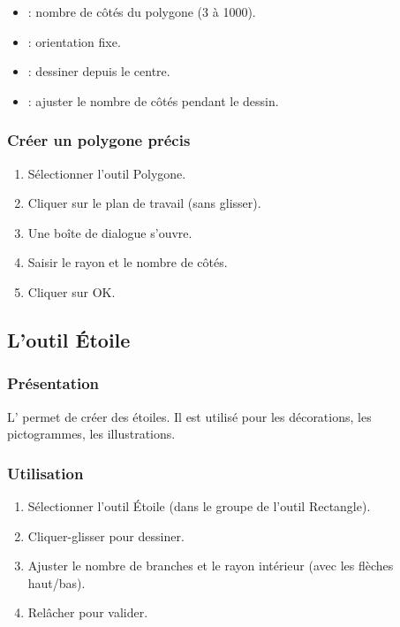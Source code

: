 \begin{itemize}
    \item {} : nombre de côtés du polygone (3 à 1000).
    \item {} : orientation fixe.
    \item {} : dessiner depuis le centre.
    \item {} : ajuster le nombre de côtés pendant le dessin.
\end{itemize}

\subsubsection{Créer un polygone précis}

\begin{enumerate}
    \item Sélectionner l'outil Polygone.
    \item Cliquer sur le plan de travail (sans glisser).
    \item Une boîte de dialogue s'ouvre.
    \item Saisir le rayon et le nombre de côtés.
    \item Cliquer sur OK.
\end{enumerate}

\subsection{L'outil Étoile}

\subsubsection{Présentation}

L' permet de créer des étoiles. Il est utilisé pour les décorations, les pictogrammes, les illustrations.

\subsubsection{Utilisation}

\begin{enumerate}
    \item Sélectionner l'outil Étoile (dans le groupe de l'outil Rectangle).
    \item Cliquer-glisser pour dessiner.
    \item Ajuster le nombre de branches et le rayon intérieur (avec les flèches haut/bas).
    \item Relâcher pour valider.
\end{enumerate}

